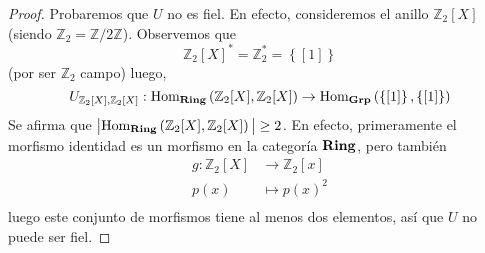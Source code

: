 \documentclass[12pt]{report}
\newcounter{it}
\theoremstyle{largebreak}
\newcommand\abs[1]{\ensuremath{\big|#1\big|}}
\newcommand{\Hom}[3]{\ensuremath{\textup{Hom}_{#1}\left(#2,#3\right)}}
\newcommand{\Cat}[1]{\ensuremath{\textup{\textbf{#1}}}}
\begin{document}
    \begin{proof}
        Probaremos que $U$ no es fiel. En efecto, consideremos el anillo
        $\mathbb{Z}_2[X]$ (siendo $\mathbb{Z}_2=\mathbb{Z}/2\mathbb{Z}$). Observemos que
        \begin{equation*}
            \mathbb{Z}_2[X]^*=\mathbb{Z}_2^*=\left\{[1]\right\}
        \end{equation*}
        (por ser $\mathbb{Z}_2$ campo) luego,
        \begin{equation*}
            U_{\mathbb{Z}_2[X],\mathbb{Z}_2[X]}:\Hom{\Cat{Ring}}{\mathbb{Z}_2[X]}{\mathbb{Z}_2[X]}\rightarrow\Hom{\Cat{Grp}}{\left\{[1]\right\}}{\left\{[1]\right\}}
        \end{equation*}
        Se afirma que $\abs{\Hom{\Cat{Ring}}{\mathbb{Z}_2[X]}{\mathbb{Z}_2[X]}}\geq 2$. En efecto, primeramente el morfismo identidad es un morfismo en la categoría $\Cat{Ring}$, pero también
        \begin{equation*}
            \begin{split}
                g:\mathbb{Z}_2[X]&\rightarrow\mathbb{Z}_2[x]\\
                p(x)&\mapsto p(x)^2\\
            \end{split}
        \end{equation*}
        luego este conjunto de morfismos tiene al menos dos elementos, así que $U$ no puede ser fiel.


\end{proof}
\end{document}
